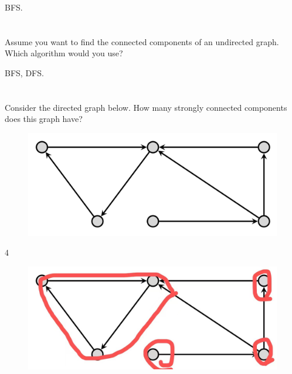 \documentclass [12pt]{article}
\begin{document}
\begin{Solution}
BFS.
\end{Solution}


\section{} Assume you want to find the connected components of an undirected graph. Which algorithm would you use?

\begin{Solution}
BFS, DFS.
\end{Solution}


\section{} Consider the directed graph below. How many strongly connected components does this graph have?

\begin{figure}[H]
    \centering
    \includegraphics[scale=0.5]{2.png} 
    \label{fig:my_label}
\end{figure}

\begin{Solution}
4
\begin{figure}[H]
    \centering
    \includegraphics[scale=0.2]{4.jpeg} 
    \label{fig:my_label}
\end{figure}
\end{Solution}
\end{document}
